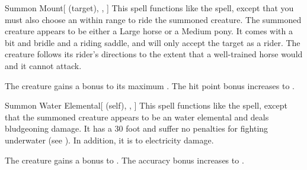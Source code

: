 \lowercase{\hypertarget{spell:Summon Mount}{}}\label{spell:Summon Mount}
\begin{attuneability}[Rank 3]{\hypertarget{spell:Summon Mount}{Summon Mount}}[ (target), , ]
This spell functions like the  spell, except that you must also choose an  within \rngmed range to ride the summoned creature.
The summoned creature appears to be either a Large horse or a Medium pony.
It comes with a bit and bridle and a riding saddle, and will only accept the target as a rider.
The creature follows its rider's directions to the extent that a well-trained horse would and it cannot attack.

\rankline
{} The creature gains a  bonus to its maximum .
 The hit point bonus increases to .
\end{attuneability}
\vspace{0.25em}



\lowercase{\hypertarget{spell:Summon Water Elemental}{}}\label{spell:Summon Water Elemental}
\begin{attuneability}[Rank 3]{\hypertarget{spell:Summon Water Elemental}{Summon Water Elemental}}[ (self), , ]
This spell functions like the  spell, except that the summoned creature appears to be an water elemental and deals bludgeoning damage.
It has a 30 foot  and suffer no penalties for fighting underwater (see ).
In addition, it is  to electricity damage.

\rankline
{} The creature gains a  bonus to .
 The accuracy bonus increases to .
\end{attuneability}
\vspace{0.25em}



